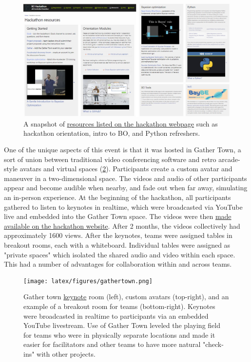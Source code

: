 \documentclass[superscriptaddress, nofootinbib,  amsmath, amssymb, twocolumn]{revtex4-2}
\begin{document}
\begin{figure}
    \centering
    \includegraphics[width=1\linewidth]{latex/figures/preparation.png}
    \caption{A snapshot of \href{https://ac-bo-hackathon.github.io/resources/}{resources listed on the hackathon webpage} such as hackathon orientation, intro to BO, and Python refreshers.}
    \label{fig:preparation}
\end{figure}

One of the unique aspects of this event is that it was hosted in Gather Town, a sort of union between traditional video conferencing software and retro arcade-style avatars and virtual spaces (\cref{fig:gathertown}). Participants create a custom avatar and maneuver in a two-dimensional space. The videos and audio of other participants appear and become audible when nearby, and fade out when far away, simulating an in-person experience. At the beginning of the hackathon, all participants gathered to listen to keynotes in realtime, which were broadcasted via YouTube live and embedded into the Gather Town space. The videos were then \href{https://ac-bo-hackathon.github.io/videos-slides/}{made available on the hackathon website}. After 2 months, the videos collectively had approximately 1600 views. After the keynotes, teams were assigned tables in breakout rooms, each with a whiteboard. Individual tables were assigned as "private spaces" which isolated the shared audio and video within each space. This had a number of advantages for collaboration within and across teams.

\begin{figure}
    \centering
    \texttt{[image: latex/figures/gathertown.png]}
    \caption{Gather town \href{https://ac-bo-hackathon.github.io/videos-slides/}{keynote} room (left), custom avatars (top-right), and an example of a breakout room for teams (bottom-right). Keynotes were broadcasted in realtime to participants via an embedded YouTube livestream. Use of Gather Town leveled the playing field for teams who were in physically separate locations and made it easier for facilitators and other teams to have more natural "check-ins" with other projects.}
    \label{fig:gathertown}
\end{figure}
\end{document}

